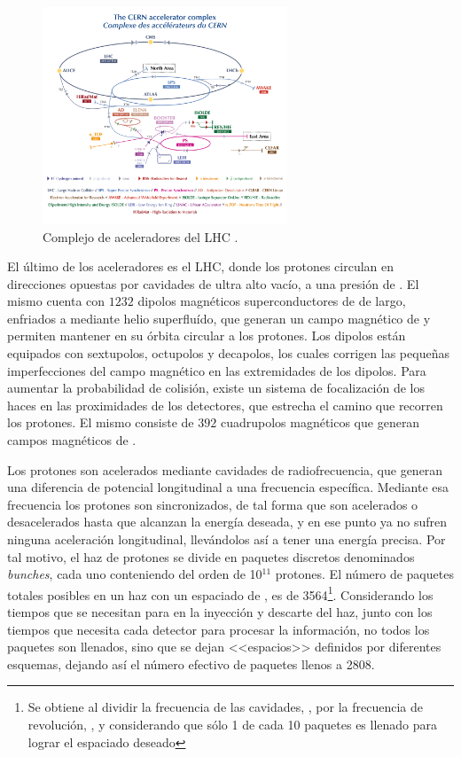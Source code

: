 \begin{figure}
  \centering
  \includegraphics[width=0.65\textwidth]{images/lhc/LHC_complex.png}
  \caption{Complejo de aceleradores del LHC \cite{Lopienska:2800984}.}
  \label{fig:LHC_complex}
\end{figure}

El último de los aceleradores es el LHC, donde los protones circulan en direcciones opuestas por cavidades de ultra alto vacío, a una presión de . El mismo cuenta con $1232$ dipolos magnéticos superconductores de  de largo, enfriados a  mediante helio superfluído, que generan un campo magnético de  y permiten mantener en su órbita circular a los protones. Los dipolos están equipados con sextupolos, octupolos y decapolos, los cuales corrigen las pequeñas imperfecciones del campo magnético en las extremidades de los dipolos. Para aumentar la probabilidad de colisión, existe un sistema de focalización de los haces en las proximidades de los detectores, que estrecha el camino que recorren los protones. El mismo consiste de $392$ cuadrupolos magnéticos que generan campos magnéticos de .

Los protones son acelerados mediante cavidades de radiofrecuencia, que generan una diferencia de potencial longitudinal a una frecuencia específica. Mediante esa frecuencia los protones son sincronizados, de tal forma que son acelerados o desacelerados hasta que alcanzan la energía deseada, y en ese punto ya no sufren ninguna aceleración longitudinal, llevándolos así a tener una energía precisa. Por tal motivo, el haz de protones se divide en paquetes discretos denominados \textit{bunches}, cada uno conteniendo del orden de 10$^{11}$ protones. El número de paquetes totales posibles en un haz con un espaciado de , es de 3564\footnote{Se obtiene al dividir la frecuencia de las cavidades, , por la frecuencia de revolución, , y considerando que sólo 1 de cada 10 paquetes es llenado para lograr el espaciado deseado}. Considerando los tiempos que se necesitan para en la inyección y descarte del haz, junto con los tiempos que necesita cada detector para procesar la información, no todos los paquetes son llenados, sino que se dejan <<espacios>> definidos por diferentes esquemas, dejando así el número efectivo de paquetes llenos a 2808.

